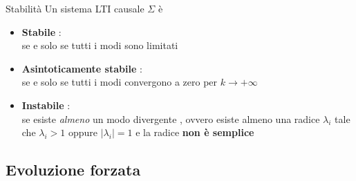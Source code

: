 \documentclass{article}
\theoremstyle{definition}
\newcommand{\la}{\lambda}
\begin{document}
	\begin{teo}{Stabilità}
		Un sistema LTI causale $\Sigma$ è 
		\begin{itemize}
			\item \textbf{Stabile} : \\ se e solo se tutti i modi sono limitati 
			\item \textbf{Asintoticamente stabile }: \\se e solo se tutti i modi convergono a zero per $k \rightarrow + \infty $
			\item \textbf{Instabile} :\\ se esiste \textit{almeno} un modo divergente , ovvero esiste almeno una radice $\la_i $ tale che $\la_i >1 $ oppure $|\la_i|=1$ e la radice \textbf{non è semplice }
		\end{itemize} 
	\end{teo}
	\subsection{Evoluzione forzata}
 
\end{document}
